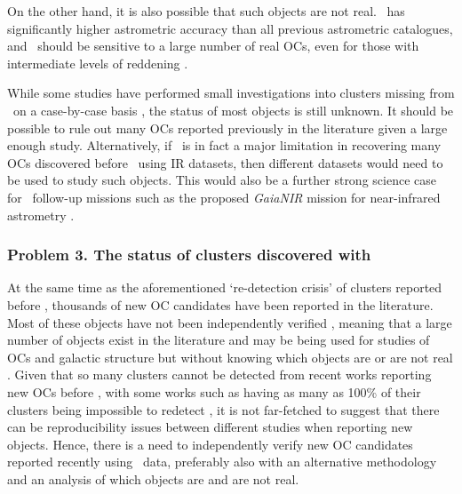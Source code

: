 On the other hand, it is also possible that such objects are not real. \gaia\ has significantly higher astrometric accuracy than all previous astrometric catalogues, and \gaia\ should be sensitive to a large number of real OCs, even for those with intermediate levels of reddening \citep{cantat-gaudin_clusters_2020}. 

While some studies have performed small investigations into clusters missing from \gaia\ on a case-by-case basis \citep[e.g.][]{cantat-gaudin_clusters_2020,piatti_catching_2023}, the status of most objects is still unknown. It should be possible to rule out many OCs reported previously in the literature given a large enough study. Alternatively, if \gaia\ is in fact a major limitation in recovering many OCs discovered before \gaia\ using IR datasets, then different datasets would need to be used to study such objects. This would also be a further strong science case for \gaia\ follow-up missions such as the proposed \emph{GaiaNIR} mission for near-infrared astrometry \citep{hobbs_gaianir_combining_2016}.


\subsubsection{Problem 3. The status of clusters discovered with \gaia}
\label{sec:intro:aims:issues:post_gaia}

At the same time as the aforementioned `re-detection crisis' of clusters reported before \gaia, thousands of new OC candidates have been reported in the literature. Most of these objects have not been independently verified \cite{cantat-gaudin_milky_2022}, meaning that a large number of objects exist in the literature and may be being used for studies of OCs and galactic structure but without knowing which objects are or are not real \citep[e.g.][]{anders_milky_2020,castro-ginard_milky_2021}. Given that so many clusters cannot be detected from recent works reporting new OCs before \gaia, with some works such as \citep{scholz_global_2015} having as many as 100\% of their clusters being impossible to redetect \citep{cantat-gaudin_gaia_2018}, it is not far-fetched to suggest that there can be reproducibility issues between different studies when reporting new objects. Hence, there is a need to independently verify new OC candidates reported recently using \gaia\ data, preferably also with an alternative methodology and an analysis of which objects are and are not real.

